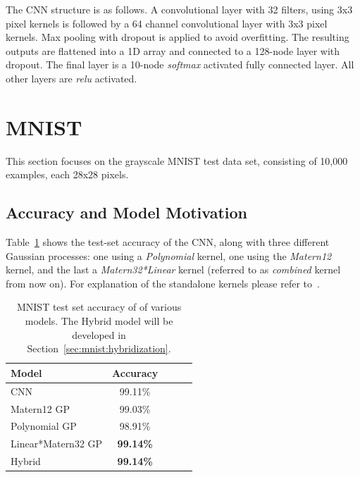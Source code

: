 \documentclass{article}
\begin{document}
The CNN structure is as follows. A convolutional layer with 32 filters, using 3x3 pixel kernels is followed by a 64 channel convolutional layer with 3x3 pixel kernels. Max pooling with dropout is applied to avoid overfitting. The resulting outputs are flattened into a 1D array and connected to a 128-node layer with dropout. The final layer is a 10-node \textit{softmax} activated fully connected layer. All other layers are \textit{relu} activated.








\section{MNIST}
\label{sec:mnist}
This section focuses on the grayscale MNIST test data set, consisting of 10,000 examples, each 28x28 pixels.

\subsection{Accuracy and Model Motivation}
\label{sec:mnist:acc}

Table~\ref{tab:model_accuracies} shows the test-set accuracy of the CNN, along with three different Gaussian processes: one using a \textit{Polynomial} kernel, one using the \textit{Matern12} kernel, and the last a \textit{Matern32*Linear} kernel (referred to as \textit{combined} kernel from now on). For explanation of the standalone kernels please refer to~\citet{rasmussen2006gaussian}.


\begin{table}[htb]
\caption{MNIST test set accuracy of of various models. The Hybrid model will be developed in Section~\ref{sec:mnist:hybridization}.}
\vskip 0.15in
\begin{center}
\begin{small}
\begin{sc}
\begin{tabular}{lcccr}
\toprule
Model 				& Accuracy \\
\midrule
CNN    				& 99.11\%  \\
Matern12 GP	 		& 99.03\%  \\
Polynomial GP    	& 98.91\%  \\
Linear*Matern32 GP	& \textbf{99.14\%}  \\
Hybrid    			& \textbf{99.14\%}  \\
\bottomrule
\end{tabular}
\end{sc}
\end{small}
\end{center}
\vskip -0.1in
\label{tab:model_accuracies}
\end{table}
\end{document}
